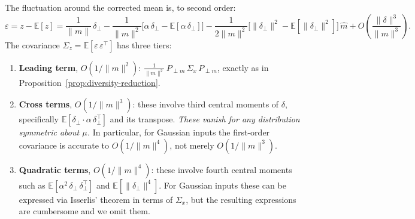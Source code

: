 The fluctuation around the corrected mean is, to second order:
%
\begin{equation}
  \varepsilon = z - \mathbb{E}[z]
  = \frac{1}{\|m\|}\,\delta_\perp
  - \frac{1}{\|m\|^2}\Big[\alpha\,\delta_\perp
    - \mathbb{E}[\alpha\,\delta_\perp]\Big]
  - \frac{1}{2\|m\|^2}\Big[\|\delta_\perp\|^2
    - \mathbb{E}[\|\delta_\perp\|^2]\Big]\,\hat{m}
  + O\!\left(\frac{\|\delta\|^3}{\|m\|^3}\right).
  \label{eq:fluctuation-second}
\end{equation}
%
The covariance $\Sigma_z = \mathbb{E}[\varepsilon\,\varepsilon^\top]$
has three tiers:
%
\begin{enumerate}
  \item \textbf{Leading term}, $O(1/\|m\|^2)$:
    $\frac{1}{\|m\|^2}\,P_{\perp m}\,\Sigma_x\,P_{\perp m}$,
    exactly as in Proposition~\ref{prop:diversity-reduction}.

  \item \textbf{Cross terms}, $O(1/\|m\|^3)$:
    these involve third central moments of $\delta$, specifically
    $\mathbb{E}[\delta_\perp \cdot \alpha\,\delta_\perp^\top]$
    and its transpose.
    \emph{These vanish for any distribution symmetric about $\mu$.}
    In particular, for Gaussian inputs the first-order covariance is
    accurate to $O(1/\|m\|^4)$, not merely $O(1/\|m\|^3)$.

  \item \textbf{Quadratic terms}, $O(1/\|m\|^4)$:
    these involve fourth central moments such as
    $\mathbb{E}[\alpha^2\,\delta_\perp\,\delta_\perp^\top]$
    and $\mathbb{E}[\|\delta_\perp\|^4]$.
    For Gaussian inputs these can be expressed via Isserlis' theorem
    in terms of $\Sigma_x$, but the resulting expressions are
    cumbersome and we omit them.
\end{enumerate}

